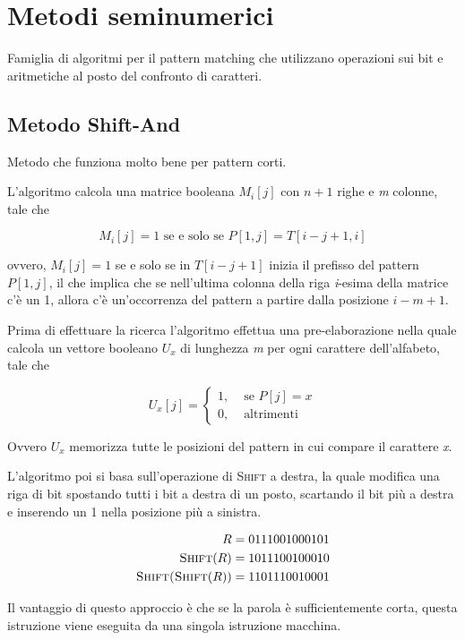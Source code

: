 \section{Metodi seminumerici}\label{metodi-seminumerici}

Famiglia di algoritmi per il pattern matching che utilizzano operazioni
sui bit e aritmetiche al posto del confronto di caratteri.

\subsection{Metodo Shift-And}\label{metodo-shift-and}

Metodo che funziona molto bene per pattern corti.

L'algoritmo calcola una matrice booleana $M_i[j]$ con
$n+1$ righe e \emph{m} colonne, tale che

$$
M_i[j] = 1 \text { se e solo se } P[1,j] = T[i-j+1, i]
$$

ovvero, $ M_i[j] = 1 $ se e solo se in $ T[i-j+1] $ inizia il prefisso del pattern $ P[1,j] $, il che implica che se nell'ultima colonna della riga \emph{i}-esima
della matrice c'è un 1, allora c'è un'occorrenza del pattern a partire
dalla posizione $i-m+1$.

Prima di effettuare la ricerca l'algoritmo effettua una pre-elaborazione
nella quale calcola un vettore booleano $U_x$ di lunghezza
\emph{m} per ogni carattere dell'alfabeto, tale che

$$U_x[j] = \begin{cases} 
1,& \text{ se } P[j] = x\\
0, & \text{ altrimenti} 
\end{cases}$$

Ovvero $U_x$ memorizza tutte le posizioni del pattern in cui
compare il carattere \emph{x}.

L'algoritmo poi si basa sull'operazione di \textsc{Shift} a destra, la
quale modifica una riga di bit spostando tutti i bit a destra di un
posto, scartando il bit più a destra e inserendo un 1 nella posizione più
a sinistra.

\begin{align*}
R &= 0111001000101 \\
\textsc{Shift}(R) &= 1011100100010 \\
\textsc{Shift(Shift}(R)) &= 1101110010001
\end{align*}

Il vantaggio di questo approccio è che se la parola è sufficientemente
corta, questa istruzione viene eseguita da una singola istruzione
macchina.

